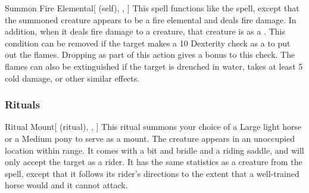 \lowercase{\hypertarget{spell:Summon Fire Elemental}{}}\label{spell:Summon Fire Elemental}
\begin{attuneability}[\nth{5}]{\hypertarget{spell:Summon Fire Elemental}{Summon Fire Elemental}}[ (self), , ]
This spell functions like the  spell, except that the summoned creature appears to be a fire elemental and deals fire damage.
In addition, when it deals fire damage to a creature, that creature is  as a .
This condition can be removed if the target makes a  10 Dexterity check as a  to put out the flames.
Dropping  as part of this action gives a  bonus to this check.
The flames can also be extinguished if the target is drenched in water, takes at least 5 cold damage, or other similar effects.
\end{attuneability}
\vspace{0.25em}



\subsubsection{Rituals}


\lowercase{\hypertarget{spell:Ritual Mount}{}}\label{spell:Ritual Mount}
\begin{attuneability}[\nth{2}]{\hypertarget{spell:Ritual Mount}{Ritual Mount}}[ (ritual), , ]
This ritual summons your choice of a Large light horse or a Medium pony to serve as a mount.
The creature appears in an unoccupied location within \rngclose range.
It comes with a bit and bridle and a riding saddle, and will only accept the target as a rider.
It has the same statistics as a creature from the  spell, except that it follows its rider's directions to the extent that a well-trained horse would and it cannot attack.
\end{attuneability}
\vspace{0.25em}


